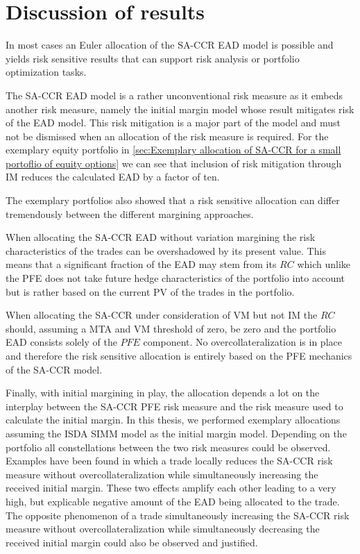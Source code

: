 \documentclass[../Thesis_AHoecherl.tex]{subfiles}
\begin{document}
    \chapter{Discussion of results}\label{sec:Discussion of results}

    In most cases an Euler allocation of the \gls{SA-CCR} \gls{EAD} model is possible and yields risk sensitive results that can support risk analysis or portfolio optimization tasks.

    The \gls{SA-CCR} \gls{EAD} model is a rather unconventional risk measure as it embeds another risk measure, namely the initial margin model whose result mitigates risk of the \gls{EAD} model.
    This risk mitigation is a major part of the model and must not be dismissed when an allocation of the risk measure is required. For the exemplary equity portfolio in \ref{sec:Exemplary allocation of SA-CCR for a small portoflio of equity options} we can see that inclusion of risk mitigation through \gls{IM} reduces the calculated \gls{EAD} by a factor of ten.

    The exemplary portfolios also showed that a risk sensitive allocation can differ tremendously between the different margining approaches. 
    
    When allocating the \gls{SA-CCR} \gls{EAD} without variation margining the risk characteristics of the trades can be overshadowed by its present value. This means that a significant fraction of the \gls{EAD} may stem from its $RC$ which unlike the PFE does not take future hedge characteristics of the portfolio into account but is rather based on the current \gls{PV} of the trades in the portfolio.

    When allocating the \gls{SA-CCR} under consideration of \gls{VM} but not \gls{IM} the $RC$ should, assuming a \gls{MTA} and \gls{VM} threshold of zero, be zero and the portfolio \gls{EAD} consists solely of the $PFE$ component. No overcollateralization is in place and therefore the risk sensitive allocation is entirely based on the PFE mechanics of the \gls{SA-CCR} model.

    Finally, with initial margining in play, the allocation depends a lot on the interplay between the \gls{SA-CCR} PFE risk measure and the risk measure used to calculate the initial margin. In this thesis, we performed exemplary allocations assuming the \gls{ISDA SIMM} model as the initial margin model. 
    Depending on the portfolio all constellations between the two risk measures could be observed. Examples have been found in which a trade locally reduces the \gls{SA-CCR} risk measure without overcollateralization while simultaneously increasing the received initial margin. These two effects amplify each other leading to a very high, but explicable negative amount of the \gls{EAD} being allocated to the trade. The opposite phenomenon of a trade simultaneously increasing the \gls{SA-CCR} risk measure without overcollateralization while simultaneously decreasing the received initial margin could also be observed and justified.
\end{document}

